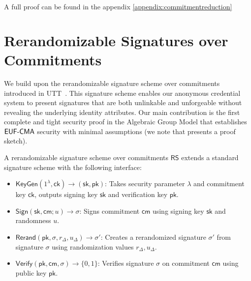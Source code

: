 A full proof can be found in the appendix \ref{appendix:commitmentreduction}
% 
% 















% 
% 
\newpage
\section{Rerandomizable Signatures over Commitments}\label{sec:rerandsig_g1}
We build upon the rerandomizable signature scheme over commitments introduced in UTT~\cite{tomescu2022utt}. This signature scheme enables our anonymous credential system to present signatures that are both unlinkable and unforgeable without revealing the underlying identity attributes. Our main contribution is the first complete and tight security proof in the Algebraic Group Model that establishes $\mathsf{EUF\text{-}CMA}$ security with minimal assumptions (we note that \cite{tomescu2022utt} presents a proof sketch).


\begin{definition}
A rerandomizable signature scheme over commitments $\mathsf{RS}$ extends a standard signature scheme with the following interface:
\begin{itemize}
    \item $\mathsf{KeyGen}(1^\lambda, \mathsf{ck}) \rightarrow (\mathsf{sk}, \mathsf{pk})$: Takes security parameter $\lambda$ and commitment key $\mathsf{ck}$, outputs signing key $\mathsf{sk}$ and verification key $\mathsf{pk}$.
    
    \item $\mathsf{Sign}(\mathsf{sk}, \mathsf{cm}; u) \rightarrow \sigma$: Signs commitment $\mathsf{cm}$ using signing key $\mathsf{sk}$ and randomness $u$.
    
    \item $\mathsf{Rerand}(\mathsf{pk}, \sigma, r_\Delta, u_\Delta) \rightarrow \sigma'$: Creates a rerandomized signature $\sigma'$ from signature $\sigma$ using randomization values $r_\Delta, u_\Delta$.
    
    \item $\mathsf{Verify}(\mathsf{pk}, \mathsf{cm}, \sigma) \rightarrow \{0,1\}$: Verifies signature $\sigma$ on commitment $\mathsf{cm}$ using public key $\mathsf{pk}$.
\end{itemize}
\end{definition}

